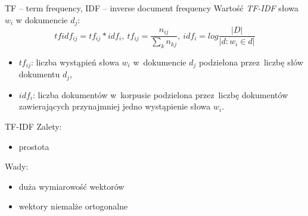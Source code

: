 \documentclass{beamer}
\begin{document}
	\begin{frame}{TF – term frequency, IDF – inverse document frequency}
		Wartość \textit{TF-IDF} słowa $w_i$ w dokumencie $d_j$:
		\begin{equation}
		\label{eq:tf-idf}
		tfidf_{ij} = tf_{ij} * idf_i,\ tf_{ij} = \frac{n_{ij}}{\sum\limits_{k}n_{kj}},\ idf_i = log\frac{|D|}{|{d:w_i \in d}|}
		\end{equation}
		\begin{itemize}
			\item $tf_{ij}$: liczba wystąpień słowa $w_i$ w~dokumencie $d_j$ podzielona przez~liczbę słów dokumentu $d_j$,
			\item $idf_i$: liczba dokumentów w~korpusie podzielona przez~liczbę dokumentów zawierających przynajmniej jedno wystąpienie słowa $w_i$.
		\end{itemize}
	\end{frame}
	\begin{frame}{TF-IDF}
		Zalety:
		\begin{itemize}
			\item prostota
		\end{itemize}
		Wady:
		\begin{itemize}
			\item duża wymiarowość wektorów
			\item wektory niemalże ortogonalne
		\end{itemize}
	\end{frame}
\end{document}
